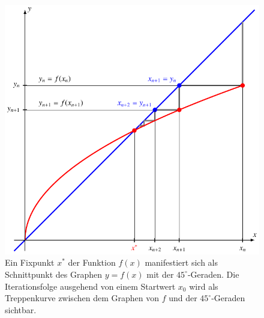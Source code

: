 \begin{beispiel}
\begin{figure}
\centering
\includegraphics{chapters/10-arithmetik/figures/iteration.pdf}
\caption{Ein Fixpunkt $x^*$ der Funktion $f(x)$ manifestiert sich als
Schnittpunkt des Graphen $y=f(x)$ mit der $45^\circ$-Geraden.
Die Iterationsfolge ausgehend von einem Startwert $x_0$ wird als
Treppenkurve zwischen dem Graphen von $f$ und der $45^\circ$-Geraden
sichtbar.
\label{buch:figure:iterationprinzip}}
\end{figure}


\end{beispiel}
